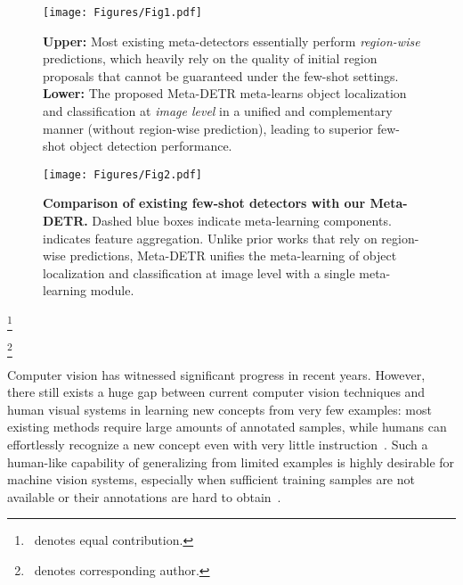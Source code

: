 \documentclass[10pt,twocolumn,letterpaper]{article}
\newcommand\blfootnote[1]{\begingroup
\renewcommand\thefootnote{}\footnote{#1}\addtocounter{footnote}{-1}\endgroup
}
\begin{document}
\begin{figure}[t!] 
\begin{center}
   \texttt{[image: Figures/Fig1.pdf]}
\end{center}
\vspace*{-0.8mm}
   \caption{\textbf{Upper:} Most existing meta-detectors essentially perform \textit{region-wise} predictions, which heavily rely on the quality of initial region proposals that cannot be guaranteed under the few-shot settings. \textbf{Lower:} The proposed Meta-DETR meta-learns object localization and classification at \textit{image level} in a unified and complementary manner (without region-wise prediction), leading to superior few-shot object detection performance.}
\label{fig:fig1}
\vspace*{-0.0mm}
\end{figure}


\begin{figure*}[t!] 
\begin{center}
   \texttt{[image: Figures/Fig2.pdf]}
\end{center}
\vspace*{-0.6mm}
   \caption{\textbf{Comparison of existing few-shot detectors with our Meta-DETR.} Dashed blue boxes indicate meta-learning components.  indicates feature aggregation. Unlike prior works that rely on region-wise predictions, Meta-DETR unifies the meta-learning of object localization and classification at image level with a single meta-learning module.}
\label{fig:fig2_methods_comparison}
\vspace*{-0.0mm}
\end{figure*}


\blfootnote{\, denotes equal contribution.}
\blfootnote{\, denotes corresponding author.}


Computer vision has witnessed significant progress in recent years. However, there still exists a huge gap between current computer vision techniques and human visual systems in learning new concepts from very few examples: most existing methods require large amounts of annotated samples, while humans can effortlessly recognize a new concept even with very little instruction~\cite{Smith2002ObjectNL,background2}. Such a human-like capability of generalizing from limited examples is highly desirable for machine vision systems, especially when sufficient training samples are not available or their annotations are hard to obtain~\cite{DLMedical,lvis,FSPillRecognition,huang2020contextual,DefectGAN,huang2021cross}.
\end{document}
